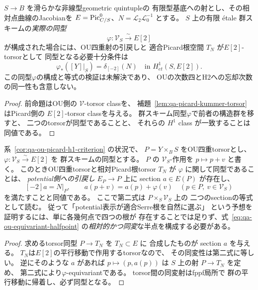 \begin{corollary}
\label{cor:qa-ou-picard-h1-criterion}
$S\to B$ を滑らかな非線型geometric quintupleの
有限型基底への射とし、その相対点曲線のJacobianを
$E=\operatorname{Pic}^0_{C/S}$、$N=\mathcal L_2\mathcal L_0^{-1}$ とする。
$S$ 上の有限 étale 群スキームの\emph{実際の同型}
\[
 \varphi:\mathcal V_S\xrightarrow{\sim}E[2]
\]
が構成された場合には、OU四重射の引戻しと
適合Picard根空間 $T_N$ が$E[2]$-torsorとして
同型となる必要十分条件は
\[
 \varphi_*([Y]|_S)=\delta_{[-2]}(N)
 \quad\text{in }H^1_{\acute et}(S,E[2]).
 \tag{OU-vs-PR}\label{eq:qa-ou-vs-picard-h1}
\]
この同型$\varphi$の構成と等式の検証は未解決であり、
OUの次数四とH2への忘却次数の同一性も含意しない。
\end{corollary}
\begin{proof}
前命題はOU側の $\mathcal V$-torsor classを、
補題~\ref{lem:qa-picard-kummer-torsor} はPicard側の
$E[2]$-torsor classを与える。
群スキーム同型$\varphi$で前者の構造群を移すと、
二つのtorsorが同型であることと、
それらの $H^1$ class が一致することは同値である。
\end{proof}

\begin{lemma}[potential側で検証できる同変半点の判定]
\label{lem:qa-ou-equivariant-halfpoint-test}
系~\ref{cor:qa-ou-picard-h1-criterion} の状況で、
$P=Y\times_BS$ をOU四重torsorとし、
$\varphi:\mathcal V_S\xrightarrow{\sim}E[2]$ を
群スキームの同型とする。
$P$ の $\mathcal V_S$-作用を $p\mapsto p+v$ と書く。
このときOU四重torsorと相対Picard根torsor $T_N$ が
$\varphi$ に関して同型であることは、
\emph{potential側への引戻し} $E_P\to P$ 上に
section $a\in E(P)$ が存在し、
\[
 [-2]a=N|_P,\qquad
 a(p+v)=a(p)+\varphi(v)
 \quad
 (p\in P,\ v\in\mathcal V_S)
 \tag{OU-half}\label{eq:qa-ou-equivariant-halfpoint}
\]
を満たすことと同値である。
ここで第二式は $P\times_S\mathcal V_S$ 上の
二つのsectionの等式として読む。
従って「potential表示が適合Serre根を自然に選ぶ」
という予想を証明するには、単に各幾何点で四つの根が
存在することでは足りず、式~\eqref{eq:qa-ou-equivariant-halfpoint}
の\emph{相対的かつ同変}な半点を構成する必要がある。
\end{lemma}
\begin{proof}
求めるtorsor同型 $P\to T_N$ を $T_N\subset E$ に
合成したものが section $a$ を与える。
$T_N$は$E[2]$の平行移動で作用するtorsorなので、
その同変性は第二式に等しい。
逆にそのような $a$ があれば
$p\mapsto(p,a(p))$ は $S$ 上の射 $P\to T_N$ を定め、
第二式により$\varphi$-equivariantである。
torsor間の同変射はfppf局所で
群の平行移動に帰着し、必ず同型となる。
\end{proof}

